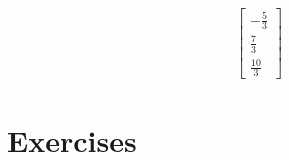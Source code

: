 \begin{equation*}
\begin{split}\displaystyle \left[\begin{matrix}- \frac{5}{3}\\\frac{7}{3}\\\frac{10}{3}\end{matrix}\right]\end{split}
\end{equation*}






\section{Exercises}
\label{\detokenize{tools-for-mathematics/04-matrices/exercises/main:exercises}}\label{\detokenize{tools-for-mathematics/04-matrices/exercises/main::doc}}

